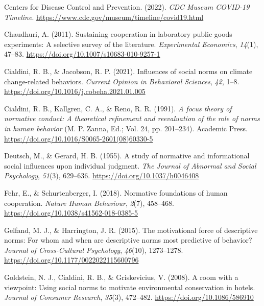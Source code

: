 \documentclass[
  man, donotrepeattitle,mask,floatsintext]{apa6}
\newlength{\cslhangindent}
\newlength{\cslentryspacingunit} %
\newenvironment{CSLReferences}[2] %
 {%
  \setlength{\parindent}{0pt}
  \ifodd #1
  \let\oldpar\par
  \def\par{\hangindent=\cslhangindent\oldpar}
  \fi
  \setlength{\parskip}{#2\cslentryspacingunit}
 }%
 {}
\begin{document}
\begin{CSLReferences}{1}{0}
\leavevmode{}%
Centers for Disease Control and Prevention. (2022). \emph{{CDC Museum COVID-19 Timeline}}. \url{https://www.cdc.gov/museum/timeline/covid19.html}

\leavevmode{}%
Chaudhuri, A. (2011). Sustaining cooperation in laboratory public goods experiments: A selective survey of the literature. \emph{Experimental Economics}, \emph{14}(1), 47--83. \url{https://doi.org/10.1007/s10683-010-9257-1}

\leavevmode{}%
Cialdini, R. B., \& Jacobson, R. P. (2021). Influences of social norms on climate change-related behaviors. \emph{Current Opinion in Behavioral Sciences}, \emph{42}, 1--8. \url{https://doi.org/10.1016/j.cobeha.2021.01.005}

\leavevmode{}%
Cialdini, R. B., Kallgren, C. A., \& Reno, R. R. (1991). \emph{A focus theory of normative conduct: A theoretical refinement and reevaluation of the role of norms in human behavior} (M. P. Zanna, Ed.; Vol. 24, pp. 201--234). Academic Press. \url{https://doi.org/10.1016/S0065-2601(08)60330-5}

\leavevmode{}%
Deutsch, M., \& Gerard, H. B. (1955). A study of normative and informational social influences upon individual judgment. \emph{The Journal of Abnormal and Social Psychology}, \emph{51}(3), 629--636. \url{https://doi.org/10.1037/h0046408}

\leavevmode{}%
Fehr, E., \& Schurtenberger, I. (2018). Normative foundations of human cooperation. \emph{Nature Human Behaviour}, \emph{2}(7), 458--468. \url{https://doi.org/10.1038/s41562-018-0385-5}

\leavevmode{}%
Gelfand, M. J., \& Harrington, J. R. (2015). The motivational force of descriptive norms: For whom and when are descriptive norms most predictive of behavior? \emph{Journal of Cross-Cultural Psychology}, \emph{46}(10), 1273--1278. \url{https://doi.org/10.1177/0022022115600796}

\leavevmode{}%
Goldstein, N. J., Cialdini, R. B., \& Griskevicius, V. (2008). A room with a viewpoint: Using social norms to motivate environmental conservation in hotels. \emph{Journal of Consumer Research}, \emph{35}(3), 472--482. \url{https://doi.org/10.1086/586910}


\end{CSLReferences}
\end{document}
